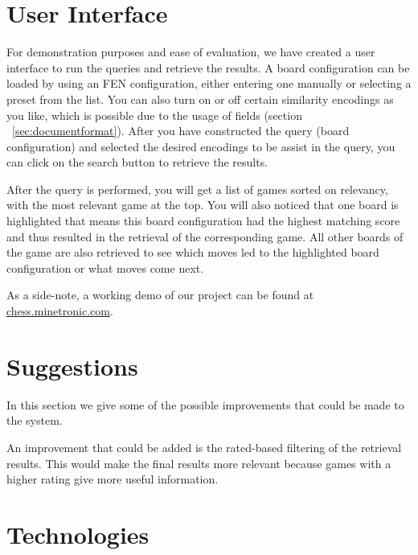 \documentclass[11pt]{article}
\begin{document}



    \section{User Interface}

    For demonstration purposes and ease of evaluation, we have created a user interface to run the queries and retrieve the results. A board configuration can be loaded by using an FEN configuration, either entering one manually or selecting a preset from the list. You can also turn on or off certain similarity encodings as you like, which is possible due to the usage of fields (section ~\ref{sec:documentformat}). After you have constructed the query (board configuration) and selected the desired encodings to be assist in the query, you can click on the search button to retrieve the results.

    After the query is performed, you will get a list of games sorted on relevancy, with the most relevant game at the top. You will also noticed that one board is highlighted that means this board configuration had the highest matching score and thus resulted in the retrieval of the corresponding game. All other boards of the game are also retrieved to see which moves led to the highlighted board configuration or what moves come next.

    As a side-note, a working demo of our project can be found at \href{http://chess.minetronic.com}{chess.minetronic.com}.


    \section{Suggestions}

    In this section we give some of the possible improvements that could be made to the system.

    An improvement that could be added is the rated-based filtering of the retrieval results. This would make the final results more relevant because games with a higher rating give more useful information.


    \section{Technologies}
\end{document}
